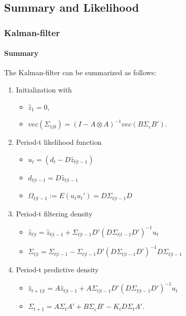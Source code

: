 \documentclass[handout]{beamer}  %
\begin{document}
\subsection{Summary and Likelihood}
\begin{frame}[shrink]\frametitle{Kalman-filter}\framesubtitle{Summary}
The Kalman-filter can be summarized as follows:
\begin{enumerate}
  \item Initialization with
  \begin{itemize}
  \item ${\widehat{z}_1} = {0}$,
  \item $vec({\Sigma_{1|0}}) = ({I}-{A}
      \otimes {A})^{-1} vec({B} {\Sigma_\varepsilon}
      {B}')$.
  \end{itemize}
  \item Period-t likelihood function
  \begin{itemize}
    \item $u_t = ({d_t} - D{\widehat{z}_{t|t-1}})$
    \item $d_{t|t-1} = D \widehat{z}_{t|t-1}$
    \item $\Omega_{t|t-1}:= E(u_t u_t')=D\Sigma_{t|t-1}D$
  \end{itemize}
  \item Period-t filtering density
  \begin{itemize}
    \item ${\widehat{z}_{t|t}}= {\widehat{z}_{t|t-1}}+ {\Sigma_{t|t-1}} {D'} \left({D}{\Sigma_{t|t-1}}{D'}\right)^{-1} {u_t}$
    \item $\Sigma_{t|t}= \Sigma_{t|t-1} - \Sigma_{t|t-1}D' \left({D}{\Sigma_{t|t-1}}{D'}\right)^{-1} D \Sigma_{t|t-1}$
  \end{itemize}
  \item Period-t predictive density
  \begin{itemize}
    \item ${\widehat{z}_{t+1|t}}  ={A} {\widehat{z}_{t|t-1}}+ {A}{\Sigma_{t|t-1}} {D'} \left({D}{\Sigma_{t|t-1}}{D'}\right)^{-1} {u_t}$
    \item ${\Sigma_{t+1}} = {A}
        {\Sigma_{t}} {A'} + {B} {\Sigma_\varepsilon}
        {B}' - {K_t} {D}
        {\Sigma_{t}}{A}'$.
    \end{itemize}
\end{enumerate}
\end{frame}
\end{document}
